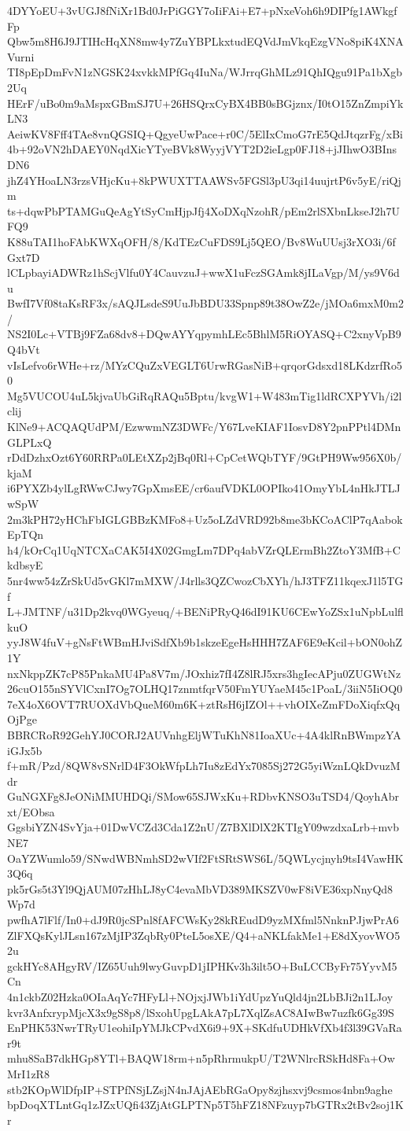 4DYYoEU+3vUGJ8fNiXr1Bd0JrPiGGY7oIiFAi+E7+pNxeVoh6h9DIPfg1AWkgfFp
Qbw5m8H6J9JTIHcHqXN8mw4y7ZuYBPLkxtudEQVdJmVkqEzgVNo8piK4XNAVurni
TI8pEpDmFvN1zNGSK24xvkkMPfGq4IuNa/WJrrqGhMLz91QhIQgu91Pa1bXgb2Uq
HErF/uBo0m9aMspxGBmSJ7U+26HSQrxCyBX4BB0sBGjznx/I0tO15ZnZmpiYkLN3
AeiwKV8Fff4TAe8vnQGSIQ+QgyeUwPace+r0C/5ElIxCmoG7rE5QdJtqzrFg/xBi
4b+92oVN2hDAEY0NqdXicYTyeBVk8WyyjVYT2D2ieLgp0FJ18+jJIhwO3BInsDN6
jhZ4YHoaLN3rzsVHjcKu+8kPWUXTTAAWSv5FGSl3pU3qi14uujrtP6v5yE/riQjm
ts+dqwPbPTAMGuQeAgYtSyCmHjpJfj4XoDXqNzohR/pEm2rlSXbnLkseJ2h7UFQ9
K88uTAI1hoFAbKWXqOFH/8/KdTEzCuFDS9Lj5QEO/Bv8WuUUsj3rXO3i/6fGxt7D
lCLpbayiADWRz1hScjVlfu0Y4CauvzuJ+wwX1uFczSGAmk8jILaVgp/M/ys9V6du
BwfI7Vf08taKsRF3x/sAQJLsdeS9UuJbBDU33Spnp89t38OwZ2e/jMOa6mxM0m2/
NS2I0Lc+VTBj9FZa68dv8+DQwAYYqpymhLEc5BhlM5RiOYASQ+C2xnyVpB9Q4bVt
vIsLefvo6rWHe+rz/MYzCQuZxVEGLT6UrwRGasNiB+qrqorGdsxd18LKdzrfRo50
Mg5VUCOU4uL5kjvaUbGiRqRAQu5Bptu/kvgW1+W483mTig1ldRCXPYVh/i2lclij
KlNe9+ACQAQUdPM/EzwwmNZ3DWFc/Y67LveKIAF1IosvD8Y2pnPPtl4DMnGLPLxQ
rDdDzhxOzt6Y60RRPa0LEtXZp2jBq0Rl+CpCetWQbTYF/9GtPH9Ww956X0b/kjaM
i6PYXZb4ylLgRWwCJwy7GpXmsEE/cr6aufVDKL0OPIko41OmyYbL4nHkJTLJwSpW
2m3kPH72yHChFbIGLGBBzKMFo8+Uz5oLZdVRD92b8me3bKCoAClP7qAabokEpTQn
h4/kOrCq1UqNTCXaCAK5I4X02GmgLm7DPq4abVZrQLErmBh2ZtoY3MfB+CkdbsyE
5nr4ww54zZrSkUd5vGKl7mMXW/J4rlls3QZCwozCbXYh/hJ3TFZ11kqexJ1l5TGf
L+JMTNF/u31Dp2kvq0WGyeuq/+BENiPRyQ46dI91KU6CEwYoZSx1uNpbLulflkuO
yyJ8W4fuV+gNsFtWBmHJviSdfXb9b1skzeEgeHsHHH7ZAF6E9eKcil+bON0ohZ1Y
nxNkppZK7cP85PnkaMU4Pa8V7m/JOxhiz7fI4Z8lRJ5xrs3hgIecAPju0ZUGWtNz
26cuO155nSYVlCxnI7Og7OLHQ17znmtfqrV50FmYUYaeM45c1PoaL/3iiN5IiOQ0
7eX4oX6OVT7RUOXdVbQueM60m6K+ztRsH6jIZOl++vhOIXeZmFDoXiqfxQqOjPge
BBRCRoR92GehYJ0CORJ2AUVnhgEljWTuKhN81IoaXUc+4A4klRnBWmpzYAiGJx5b
f+mR/Pzd/8QW8vSNrlD4F3OkWfpLh7Iu8zEdYx7085Sj272G5yiWznLQkDvuzMdr
GuNGXFg8JeONiMMUHDQi/SMow65SJWxKu+RDbvKNSO3uTSD4/QoyhAbrxt/EObsa
GgsbiYZN4SvYja+01DwVCZd3Cda1Z2nU/Z7BXlDlX2KTIgY09wzdxaLrb+mvbNE7
OaYZWumlo59/SNwdWBNmhSD2wVIf2FtSRtSWS6L/5QWLycjnyh9tsI4VawHK3Q6q
pk5rGs5t3Yl9QjAUM07zHhLJ8yC4evaMbVD389MKSZV0wF8iVE36xpNnyQd8Wp7d
pwfhA7lFlf/In0+dJ9R0jcSPnl8fAFCWsKy28kREudD9yzMXfml5NnknPJjwPrA6
ZlFXQsKylJLsn167zMjIP3ZqbRy0PteL5osXE/Q4+aNKLfakMe1+E8dXyovWO52u
gckHYc8AHgyRV/IZ65Uuh9lwyGuvpD1jIPHKv3h3ilt5O+BuLCCByFr75YyvM5Cn
4n1ckbZ02Hzka0OIaAqYc7HFyLl+NOjxjJWb1iYdUpzYuQld4jn2LbBJi2n1LJoy
kvr3AnfxrypMjcX3x9gS8p8/lSxohUpgLAkA7pL7XqlZsAC8AIwBw7uzfk6Gg39S
EnPHK53NwrTRyU1eohiIpYMJkCPvdX6i9+9X+SKdfuUDHkVfXb4f3l39GVaRar9t
mhu8SaB7dkHGp8YTl+BAQW18rm+n5pRhrmukpU/T2WNlrcRSkHd8Fa+OwMrI1zR8
stb2KOpWlDfpIP+STPfNSjLZsjN4nJAjAEbRGaOpy8zjhsxvj9csmos4nbn9aghe
bpDoqXTLntGq1zJZxUQfi43ZjAtGLPTNp5T5hFZ18NFzuyp7bGTRx2tBv2soj1Kr
